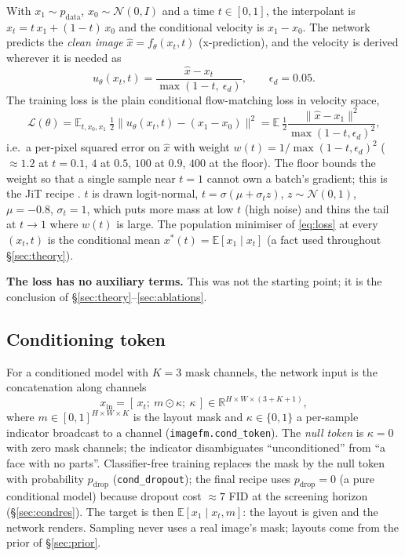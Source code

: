 \documentclass[11pt]{article}
\newcommand{\Rb}{\mathbb{R}}
\newcommand{\E}{\mathbb{E}}
\newcommand{\xh}{\hat{x}}
\begin{document}
With $x_1\sim p_{\text{data}}$, $x_0\sim\mathcal N(0,I)$ and a time $t\in[0,1]$, the
interpolant is $x_t=t\,x_1+(1-t)\,x_0$ and the conditional velocity is $x_1-x_0$. The
network predicts the \emph{clean image} $\xh=f_\theta(x_t,t)$ (x-prediction), and the
velocity is derived wherever it is needed as
\begin{equation}
u_\theta(x_t,t)=\frac{\xh-x_t}{\max(1-t,\ \epsilon_d)},\qquad \epsilon_d=0.05 .
\label{eq:vel}
\end{equation}
The training loss is the plain conditional flow-matching loss in velocity space,
\begin{equation}
\mathcal L(\theta)=\E_{t,x_0,x_1}\ \tfrac12\bigl\|u_\theta(x_t,t)-(x_1-x_0)\bigr\|^2
 =\E\ \tfrac12\frac{\|\xh-x_1\|^2}{\max(1-t,\epsilon_d)^2},
\label{eq:loss}
\end{equation}
i.e.\ a per-pixel squared error on $\xh$ with weight $w(t)=1/\max(1-t,\epsilon_d)^2$
($\approx1.2$ at $t=0.1$, $4$ at $0.5$, $100$ at $0.9$, $400$ at the floor). The floor
bounds the weight so that a single sample near $t=1$ cannot own a batch's gradient;
this is the JiT recipe \citep{li2026jit}. $t$ is drawn logit-normal,
$t=\sigma(\mu+\sigma_t z)$, $z\sim\mathcal N(0,1)$, $\mu=-0.8$, $\sigma_t=1$, which
puts more mass at low $t$ (high noise) and thins the tail at $t\to1$ where $w(t)$ is
large. The population minimiser of \eqref{eq:loss} at every $(x_t,t)$ is the
conditional mean $x^*(t)=\E[x_1\mid x_t]$ (a fact used throughout \S\ref{sec:theory}).

\textbf{The loss has no auxiliary terms.} This was not the starting point; it is the
conclusion of \S\ref{sec:theory}--\ref{sec:ablations}.

\subsection{Conditioning token}\label{sec:cond}

For a conditioned model with $K=3$ mask channels, the network input is the
concatenation along channels
\begin{equation}
x_{\text{in}}=[\,x_t;\ m\odot\kappa;\ \kappa\,]\in\Rb^{H\times W\times(3+K+1)},
\end{equation}
where $m\in[0,1]^{H\times W\times K}$ is the layout mask and $\kappa\in\{0,1\}$ a
per-sample indicator broadcast to a channel (\texttt{imagefm.cond\_token}). The
\emph{null token} is $\kappa=0$ with zero mask channels; the indicator disambiguates
``unconditioned'' from ``a face with no parts''. Classifier-free training
\citep{ho2022cfg} replaces the mask by the null token with probability $p_{\text{drop}}$
(\texttt{cond\_dropout}); the final recipe uses $p_{\text{drop}}=0$ (a pure conditional
model) because dropout cost $\approx7$ FID at the screening horizon
(\S\ref{sec:condres}). The target is then $\E[x_1\mid x_t,m]$: the layout is given and
the network renders. Sampling never uses a real image's mask; layouts come from the
prior of \S\ref{sec:prior}.
\end{document}
